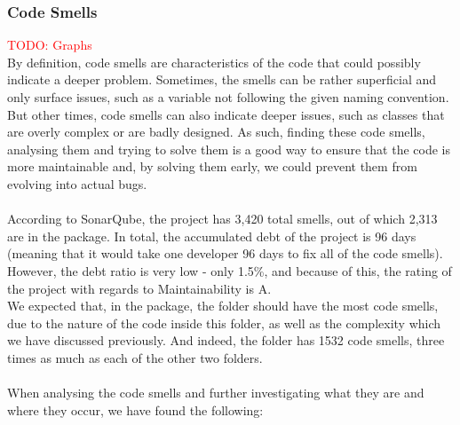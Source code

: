         \subsubsection{Code Smells}
            \textcolor{red}{TODO: Graphs}\\
            By definition, code smells are characteristics of the code that could possibly indicate a deeper problem. Sometimes, the smells can be rather superficial and only surface issues, such as a variable not following the given naming convention. But other times, code smells can also indicate deeper issues, such as classes that are overly complex or are badly designed. As such, finding these code smells, analysing them and trying to solve them is a good way to ensure that the code is more maintainable and, by solving them early, we could prevent them from evolving into actual bugs. 
            \\ \\
            According to SonarQube, the project has 3,420 total smells, out of which 2,313 are in the  package. In total, the accumulated debt of the project is 96 days (meaning that it would take one developer 96 days to fix all of the code smells). However, the debt ratio is very low - only 1.5\%, and because of this, the rating of the project with regards to Maintainability is A.\\
            We expected that, in the  package, the  folder should have the most code smells, due to the nature of the code inside this folder, as well as the complexity which we have discussed previously. And indeed, the folder has 1532 code smells, three times as much as each of the other two folders. \\\\
            When analysing the code smells and further investigating what they are and where they occur, we have found the following: 
